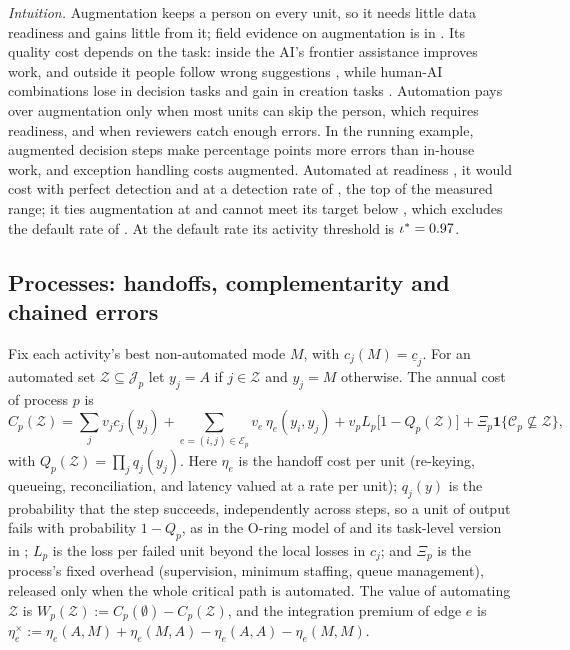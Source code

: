\noindent\emph{Intuition.} Augmentation keeps a person on every unit, so it needs little data readiness and gains little from it; field evidence on augmentation is in \citet{brynjolfsson2025generative}. Its quality cost depends on the task: inside the AI's frontier assistance improves work, and outside it people follow wrong suggestions \citep{dellacqua2026navigating}, while human-AI combinations lose in decision tasks and gain in creation tasks \citep{vaccaro2024when}. Automation pays over augmentation only when most units can skip the person, which requires readiness, and when reviewers catch enough errors. In the running example, augmented decision steps make \icEUdecision{} percentage points more errors than in-house work, and exception handling costs \icExcU{} augmented. Automated at readiness \icIotaHigh, it would cost \icExcAone{} with perfect detection and \icExcAill{} at a detection rate of \icDill, the top of the measured range; it ties augmentation at \icExcDtie{} and cannot meet its target below \icExcDinf, which excludes the default rate of \icDR. At the default rate its activity threshold is $\iota^*=0.97$.

\subsection{Processes: handoffs, complementarity and chained errors}\label{sec:tasks-process}

\begin{assumption}\label{ass:tasks-process}
Fix each activity's best non-automated mode $M$, with $c_j(M)=\underline c_j$. For an automated set $\mathcal Z\subseteq\mathcal J_p$ let $y_j=A$ if $j\in\mathcal Z$ and $y_j=M$ otherwise. The annual cost of process $p$ is
\begin{equation}\label{eq:tasks-process}
C_p(\mathcal Z)=\sum_{j}v_jc_j(y_j)+\sum_{e=(i,j)\in\mathcal E_p}v_e\,\eta_e(y_i,y_j)+v_pL_p\bigl[1-Q_p(\mathcal Z)\bigr]+\Xi_p\mathbf 1\{\mathcal C_p\not\subseteq\mathcal Z\},
\end{equation}
with $Q_p(\mathcal Z)=\prod_jq_j(y_j)$. Here $\eta_e$ is the handoff cost per unit (re-keying, queueing, reconciliation, and latency valued at a rate per unit); $q_j(y)$ is the probability that the step succeeds, independently across steps, so a unit of output fails with probability $1-Q_p$, as in the O-ring model of \citet{kremer1993oring} and its task-level version in \citet{gans2026oring}; $L_p$ is the loss per failed unit beyond the local losses in $c_j$; and $\Xi_p$ is the process's fixed overhead (supervision, minimum staffing, queue management), released only when the whole critical path is automated. The value of automating $\mathcal Z$ is $W_p(\mathcal Z):=C_p(\emptyset)-C_p(\mathcal Z)$, and the integration premium of edge $e$ is $\eta^\times_e:=\eta_e(A,M)+\eta_e(M,A)-\eta_e(A,A)-\eta_e(M,M)$.
\end{assumption}

